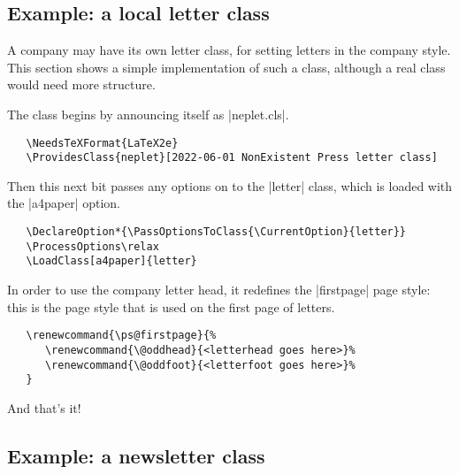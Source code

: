 \documentclass{ltxguide}
\begin{document}
\subsection{Example: a local letter class}

A company may have its own letter class, for setting letters in the
company style.  This section shows a simple implementation of such a
class, although a real class would need more structure.

The class begins by announcing itself as |neplet.cls|.
\begin{verbatim}
   \NeedsTeXFormat{LaTeX2e}
   \ProvidesClass{neplet}[2022-06-01 NonExistent Press letter class]
\end{verbatim}
Then this next bit passes any options on to the |letter| class, which is loaded
with the |a4paper| option.
\begin{verbatim}
   \DeclareOption*{\PassOptionsToClass{\CurrentOption}{letter}}
   \ProcessOptions\relax
   \LoadClass[a4paper]{letter}
\end{verbatim}
In order to use the company letter head, it redefines the |firstpage| page
style: this is the page style that is used on the first page of letters.
\begin{verbatim}
   \renewcommand{\ps@firstpage}{%
      \renewcommand{\@oddhead}{<letterhead goes here>}%
      \renewcommand{\@oddfoot}{<letterfoot goes here>}%
   }
\end{verbatim}
And that's it!

\subsection{Example: a newsletter class}
\label{subsec:newsletter}
\end{document}
